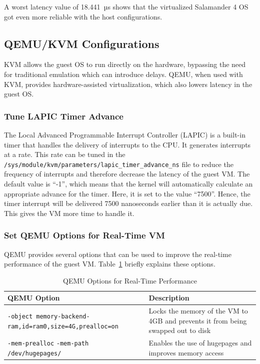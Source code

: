 \documentclass[MMR,Master,english]{style/twbook}
\begin{document}
\noindent A worst latency value of 18.441~µs shows that the virtualized Salamander 4 OS got even more reliable with the host configurations.

\clearpage

\subsection{QEMU/KVM Configurations}\label{subsec:guest_configurations}
KVM allows the guest OS to run directly on the hardware, bypassing the need for traditional emulation which can introduce delays. QEMU, when used with KVM, provides hardware-assisted virtualization, which also lowers latency in the guest OS.

\subsubsection{Tune LAPIC Timer Advance}
The Local Advanced Programmable Interrupt Controller (LAPIC) is a built-in timer that handles the delivery of interrupts to the CPU. It generates interrupts at a rate. This rate can be tuned in the \texttt{/sys/module/kvm/parameters/lapic\_timer\_advance\_ns} file to reduce the frequency of interrupts and therefore decrease the latency of the guest VM. The default value is ``-1'', which means that the kernel will automatically calculate an appropriate advance for the timer. Here, it is set to the value ``7500''. Hence, the timer interrupt will be delivered 7500 nanoseconds earlier than it is actually due. This gives the VM more time to handle it.

\subsubsection{Set QEMU Options for Real-Time VM}
QEMU provides several options that can be used to improve the real-time performance of the guest VM. Table~\ref{tab:qemu_options} briefly explains these options.

\begin{table}[H]
	\centering
	\caption{QEMU Options for Real-Time Performance}
	\label{tab:qemu_options}
	\setlength{\tabcolsep}{0.5em} %
	{\renewcommand{\arraystretch}{1.2}%
		\begin{tabular}{|p{6.5cm}|p{8cm}|}
			\hline
			\textbf{QEMU Option}                                                             & \textbf{Description}                                                             \\\hline
			\texttt{-object memory-backend-ram,}\newline\texttt{id=ram0,size=4G,prealloc=on} & Locks the memory of the VM to 4GB and prevents it from being swapped out to disk \\\hline
			\texttt{-mem-prealloc} \newline \texttt{-mem-path /dev/hugepages/}               & Enables the use of hugepages and improves \newline memory access                 \\\hline
		\end{tabular}}
\end{table}
\end{document}
